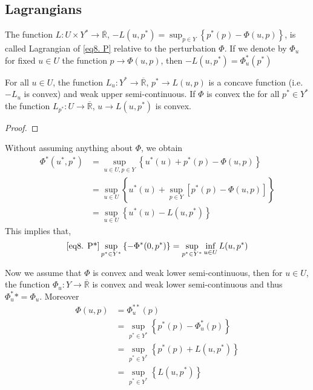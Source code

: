 \subsection{Lagrangians}
\begin{definition}
	The function $L:U\times Y^* \rightarrow \overline{\mathbb{R}}$, $-L(u, p^*)=\sup_{p\in Y} \left\lbrace p^*(p) - \Phi(u, p)
	\right\rbrace$, is called Lagrangian of \eqref{eq8. P} relative to the perturbation $\Phi$. If we denote by $\Phi_u$ for fixed $u\in U$ the function $p\rightarrow \Phi(u, p)$, then $-L(u, p^*)=\Phi^*_u(p^*)$
\end{definition}

\begin{lemma}
	For all $u\in U$, the function $L_u: Y^* \rightarrow \overline{\mathbb{R}}$, $p^*\rightarrow L(u, p)$ is  a concave function (i.e. $-L_u$ is convex) and weak upper semi-continuous. If $\Phi$ is convex the for all $p^* \in Y^*$ the function $L_{p^*}: U\rightarrow \overline{\mathbb{R}}$, $u\rightarrow L(u, p^*)$ is convex.
	\begin{proof}

	\end{proof}
\end{lemma}

Without assuming anything about $\Phi$, we obtain
\begin{align*}
	\Phi^*(u^*, p^*) &= \sup_{u\in U, p\in Y} \left\lbrace u^*(u) + p^*(p) - \Phi(u,p) \right\rbrace \\
	&= \sup_{u\in U} \left\lbrace u^*(u) + \sup_{p\in Y}\left[p^*(p) - \Phi(u,p)\right]
	\right\rbrace \\
	&= \sup_{u \in U}\left\lbrace  u^*(u)-L(u, p^*) \right\rbrace
\end{align*}
This implies that,
\[
	\eqref{eq8. P*} \sup_{p^* \in Y^*} \left\lbrace -\Phi^*(0, p^*) \right\rbrace = \sup_{p^* \in Y^*} \inf_{u \in U} L(u, p^*)
\]

Now we assume that $\Phi$ is convex and weak lower semi-continuous, then for $u\in U$, the function 
$\Phi_u : Y \rightarrow \overline{\mathbb{R}}$ is convex and weak lower semi-continuous and thus $\Phi_u^** =\Phi_u$. Moreover
\begin{align*}
	\Phi(u,p)&=\Phi_u^{**}(p) \\
	&=\sup_{p^* \in Y^*}\left\lbrace
	p^*(p)-\Phi_u^*(p)
	\right\rbrace\\ 
	&=\sup_{p^*\in Y^*}\left\lbrace
	p^*(p)+L(u, p^*)
	\right\rbrace \\
	&=\sup_{p^*\in Y^*}\left\lbrace L(u, p^*)\right\rbrace
\end{align*}

